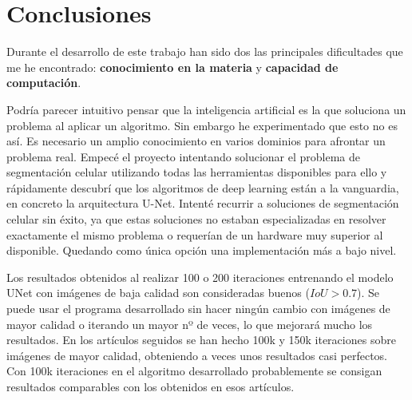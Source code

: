 \chapter{Conclusiones}\label{pruebas}

Durante el desarrollo de este trabajo han sido dos las principales dificultades que me he encontrado: \textbf{conocimiento en la materia} y \textbf{capacidad de computación}.

Podría parecer intuitivo pensar que la inteligencia artificial es la que soluciona un problema al aplicar un algoritmo. Sin embargo he experimentado que esto no es así. Es necesario un amplio conocimiento en varios dominios para afrontar un problema real. Empecé el proyecto intentando solucionar el problema de segmentación celular utilizando todas las herramientas disponibles para ello y rápidamente descubrí que los algoritmos de deep learning están a la vanguardia, en concreto la arquitectura U-Net. Intenté recurrir a soluciones de segmentación celular sin éxito, ya que estas soluciones no estaban especializadas en resolver exactamente el mismo problema o requerían de un hardware muy superior al disponible. Quedando como única opción una implementación más a bajo nivel.

Los resultados obtenidos al realizar 100 o 200 iteraciones entrenando el modelo UNet con imágenes de baja calidad son consideradas buenos ($IoU>0.7$). Se puede usar el programa desarrollado sin hacer ningún cambio con imágenes de mayor calidad o iterando un mayor nº de veces, lo que mejorará mucho los resultados. En los artículos seguidos se han hecho 100k y 150k iteraciones sobre imágenes de mayor calidad, obteniendo a veces unos resultados casi perfectos. Con 100k iteraciones en el algoritmo desarrollado probablemente se consigan resultados comparables con los obtenidos en esos artículos.
